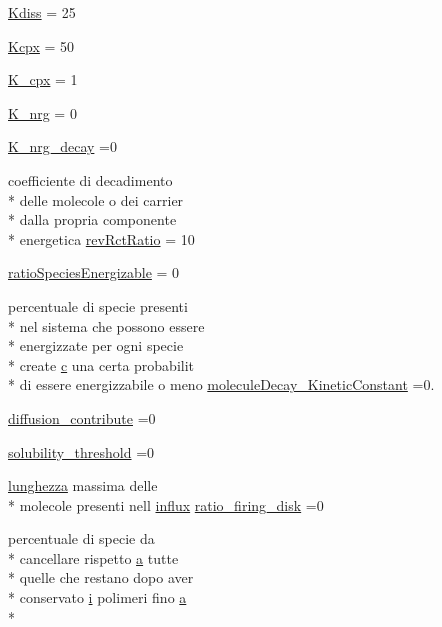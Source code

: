 \begin{DoxyCompactItemize}
\hyperlink{a00065_a51a314f9df0eaa4488a1b264d1de0173}{Kdiss} = 25
\item 
\hyperlink{a00065_aaea32371e0f1645dcea44ce4d4a3d147}{Kcpx} = 50
\item 
\hyperlink{a00065_a26dbdfeb290332837753db666ee56981}{K\-\_\-cpx} = 1
\item 
\hyperlink{a00065_ac8f2b2a8d859ca2b7cf056575c7b0538}{K\-\_\-nrg} = 0
\item 
\hyperlink{a00065_abd02c282e86e2173abc6daed03f73584}{K\-\_\-nrg\-\_\-decay} =0
\item 
coefficiente di decadimento \\*
delle molecole o dei carrier \\*
dalla propria componente \\*
energetica \hyperlink{a00065_aa7d97d27bd1a172a2f0ad49ef13ef8ac}{rev\-Rct\-Ratio} = 10
\item 
\hyperlink{a00065_a1fa680d8b3a4f885d99f56fef41d2c37}{ratio\-Species\-Energizable} = 0
\item 
percentuale di specie presenti \\*
nel sistema che possono essere \\*
energizzate per ogni specie \\*
create \hyperlink{a00029_a6be92348ba85ef257b11d06209e1d7b6}{c} una certa probabilit \\*
di essere energizzabile o meno \hyperlink{a00065_a85569bbcfd8fbc0081b5a144eaf516f5}{molecule\-Decay\-\_\-\-Kinetic\-Constant} =0.
\item 
\hyperlink{a00065_a9341167cb56ed18499df723220990b9c}{diffusion\-\_\-contribute} =0
\item 
\hyperlink{a00065_acbefa7c9bfd826fec9b32fa3bd29c288}{solubility\-\_\-threshold} =0
\item 
\hyperlink{a00058_a984d293145d85a936f430c0990316e51}{lunghezza} massima delle \\*
molecole presenti nell \hyperlink{a00059_a902e747aeec6b345d3a057099152f41f}{influx} \hyperlink{a00065_a83c1660d71068ae836121af0890bb3dd}{ratio\-\_\-firing\-\_\-disk} =0
\item 
percentuale di specie da \\*
cancellare rispetto \hyperlink{a00029_a2ffdbad9ea59541e59cbd2b938e0770c}{a} tutte \\*
quelle che restano dopo aver \\*
conservato \hyperlink{a00065_ad3efca1ea6e3333daf30719ee0501862}{i} polimeri fino \hyperlink{a00029_a2ffdbad9ea59541e59cbd2b938e0770c}{a} \\*

\end{DoxyCompactItemize}

